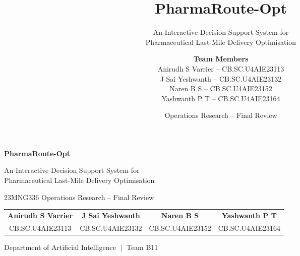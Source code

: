 \documentclass[aspectratio=169,10pt]{beamer}
\title{PharmaRoute-Opt}
\subtitle{An Interactive Decision Support System for\\
Pharmaceutical Last-Mile Delivery Optimisation}
\author{
\textbf{Team Members}\\[0.15cm]
Anirudh S Varrier -- CB.SC.U4AIE23113\\
J Sai Yeshwanth -- CB.SC.U4AIE23132\\
Naren B S -- CB.SC.U4AIE23152\\
Yashwanth P T -- CB.SC.U4AIE23164
}
\institute{Team: B11}
\date{Operations Research -- Final Review}
\begin{document}

\begin{frame}[plain]
    \vspace{1.1cm}
    \begin{center}
        {\color{white}\textbf{PharmaRoute-Opt}\par}
        \vspace{0.35cm}
        {\color{white}\large
        An Interactive Decision Support System for\\
        Pharmaceutical Last-Mile Delivery Optimisation\par}
        \vspace{0.45cm}
        {\color{white}\normalsize 23MNG336 Operations Research -- Final Review\par}
        \vspace{0.45cm}

        {\color{white}
        \begin{tabular}{cccc}
            \small\textbf{Anirudh S Varrier} & \small\textbf{J Sai Yeshwanth} & \small\textbf{Naren B S} & \small\textbf{Yashwanth P T} \\[0.08cm]
            \scriptsize CB.SC.U4AIE23113 & \scriptsize CB.SC.U4AIE23132 & \scriptsize CB.SC.U4AIE23152 & \scriptsize CB.SC.U4AIE23164
        \end{tabular}\par}

        \vspace{0.4cm}
        {\color{white}\small Department of Artificial Intelligence $\;\vert\;$ Team B11\par}
    \end{center}
\end{frame}
\usebackgroundtemplate{}

\end{document}
